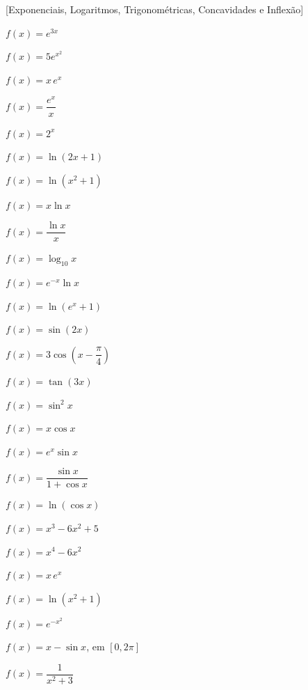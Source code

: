 \documentclass[12pt]{article}
\begin{document}
[Exponenciais, Logaritmos, Trigonométricas, Concavidades e Inflexão]


\begin{exercicios}
  \item $f(x) = e^{3x}$
  \item $f(x) = 5e^{x^2}$
  \item $f(x) = x\,e^{x}$
  \item $f(x) = \dfrac{e^x}{x}$
  \item $f(x) = 2^x$
  \item $f(x) = \ln(2x + 1)$
  \item $f(x) = \ln(x^2 + 1)$
  \item $f(x) = x\ln x$
  \item $f(x) = \dfrac{\ln x}{x}$
  \item $f(x) = \log_{10} x$
  \item $f(x) = e^{-x}\ln x$
  \item $f(x) = \ln\left(e^x + 1\right)$
\end{exercicios}

\begin{exercicios}
  \item $f(x) = \sin(2x)$
  \item $f(x) = 3\cos\left(x - \dfrac{\pi}{4}\right)$
  \item $f(x) = \tan(3x)$
  \item $f(x) = \sin^2 x$
  \item $f(x) = x\cos x$
  \item $f(x) = e^x \sin x$
  \item $f(x) = \dfrac{\sin x}{1 + \cos x}$
  \item $f(x) = \ln(\cos x)$
\end{exercicios}

\begin{exercicios}
  \item $f(x) = x^3 - 6x^2 + 5$
  \item $f(x) = x^4 - 6x^2$
  \item $f(x) = x\,e^{x}$
  \item $f(x) = \ln(x^2 + 1)$
  \item $f(x) = e^{-x^2}$
  \item $f(x) = x - \sin x$, \; em $[0, 2\pi]$
  \item $f(x) = \dfrac{1}{x^2 + 3}$
\end{exercicios}
\end{document}
